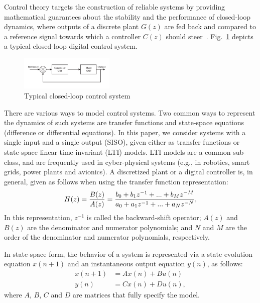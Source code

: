 \documentclass[conference]{IEEEtran}
\begin{document}
Control theory targets the construction of reliable systems by providing
mathematical guarantees about the stability and the performance of
closed-loop dynamics, where outputs of a discrete plant $G(z)$ are fed back
and compared to a reference signal towards which a controller $C(z)$ should
steer~\cite{astrom1997computer}.  Fig.~\ref{fig:typical-control-system}
depicts a typical closed-loop digital control system.
%
\begin{figure}[ht!]
\centering
\includegraphics[width=0.4\textwidth]{closedloopseries.pdf}
\caption{Typical closed-loop control system}
\label{fig:typical-control-system}
\end{figure}


There are various ways to model control systems.  Two common ways to
represent the dynamics of such systems are transfer functions and
state-space equations (difference or differential equations).  In this
paper, we consider systems with a single input and a single output (SISO),
given either as transfer functions or state-space linear time-invariant
(LTI) models.  LTI models are a common sub-class, and are frequently used in
cyber-physical systems (e.g., in robotics, smart grids, power plants and
avionics).  A discretized plant or a digital controller is, in general,
given as follows when using the transfer function representation:
%
\begin{equation}
\small
\label{eq:transferfunction}
H(z)=\frac{B(z)}{A(z)}=\frac{b_{0}+b_{1}z^{-1}+...+b_{M}z^{-M}}{a_{0}+a_{1}z^{-1}+...+a_{N}z^{-N}},
\end{equation}
%
In this representation, $z^{-1}$ is called the backward-shift operator;
$A(z)$ and $B(z)$ are the denominator and numerator polynomials; and $N$ and
$M$ are the order of the denominator and numerator polynomials, respectively.

In state-space form, the behavior of a system is represented via a state
evolution equation $x(n+1)$ and an instantaneous output equation $y(n)$, as
follows:
%
\begin{equation}
\begin{split}
x(n+1) &= A x(n) + B u(n)
\\
y(n) &= C x(n) + D u(n), 
\end{split}\label{eq:ss-example}
\end{equation}
%
where $A$, $B$, $C$ and $D$ are matrices that fully specify the model. 
\end{document}
